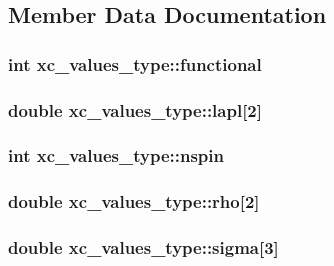 \subsection{Member Data Documentation}
\hypertarget{structxc__values__type_a89b7246e52d0672ae31f8dbb852f2d32}{
\subsubsection[{functional}]{\setlength{\rightskip}{0pt plus 5cm}int xc\-\_\-values\-\_\-type\-::functional}}\label{structxc__values__type_a89b7246e52d0672ae31f8dbb852f2d32}
\hypertarget{structxc__values__type_a6f3b62347fd67edb7092b1bb8e156c97}{
\subsubsection[{lapl}]{\setlength{\rightskip}{0pt plus 5cm}double xc\-\_\-values\-\_\-type\-::lapl\mbox{[}2\mbox{]}}}\label{structxc__values__type_a6f3b62347fd67edb7092b1bb8e156c97}
\hypertarget{structxc__values__type_ac114cc7665095c94537b4e940b3f6dd7}{
\subsubsection[{nspin}]{\setlength{\rightskip}{0pt plus 5cm}int xc\-\_\-values\-\_\-type\-::nspin}}\label{structxc__values__type_ac114cc7665095c94537b4e940b3f6dd7}
\hypertarget{structxc__values__type_ab01263a947376686e908a318ccd92d1f}{
\subsubsection[{rho}]{\setlength{\rightskip}{0pt plus 5cm}double xc\-\_\-values\-\_\-type\-::rho\mbox{[}2\mbox{]}}}\label{structxc__values__type_ab01263a947376686e908a318ccd92d1f}
\hypertarget{structxc__values__type_abb97f39162aebec8ed756ba3919fd78e}{
\subsubsection[{sigma}]{\setlength{\rightskip}{0pt plus 5cm}double xc\-\_\-values\-\_\-type\-::sigma\mbox{[}3\mbox{]}}}\label{structxc__values__type_abb97f39162aebec8ed756ba3919fd78e}

